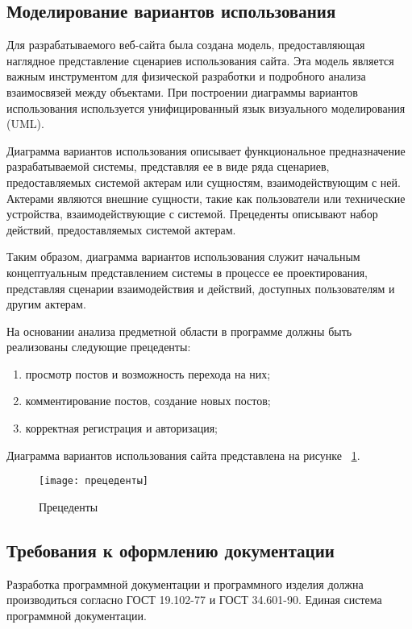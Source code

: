 \subsection{Моделирование вариантов использования}

Для разрабатываемого веб-сайта была создана модель, предоставляющая наглядное представление сценариев использования сайта. Эта модель является важным инструментом для физической разработки и подробного анализа взаимосвязей между объектами. При построении диаграммы вариантов использования используется унифицированный язык визуального моделирования (UML).

Диаграмма вариантов использования описывает функциональное предназначение разрабатываемой системы, представляя ее в виде ряда сценариев, предоставляемых системой актерам или сущностям, взаимодействующим с ней. Актерами являются внешние сущности, такие как пользователи или технические устройства, взаимодействующие с системой. Прецеденты описывают набор действий, предоставляемых системой актерам.

Таким образом, диаграмма вариантов использования служит начальным концептуальным представлением системы в процессе ее проектирования, представляя сценарии взаимодействия и действий, доступных пользователям и другим актерам.

На основании анализа предметной области в программе должны быть реализованы следующие прецеденты:
\begin{enumerate}
\item просмотр постов и возможность перехода на них;
\item комментирование постов, создание новых постов;
\item корректная регистрация и авторизация;
\end{enumerate}

Диаграмма вариантов использования сайта представлена на рисунке 
~\ref{прецеденты:image}.

\begin{figure}[ht]
	\texttt{[image: прецеденты]}
	\caption{Прецеденты}
	\label{прецеденты:image}
\end{figure}

\subsection{Требования к оформлению документации}

Разработка программной документации и программного изделия должна производиться согласно ГОСТ 19.102-77 и ГОСТ 34.601-90. Единая система программной документации.
